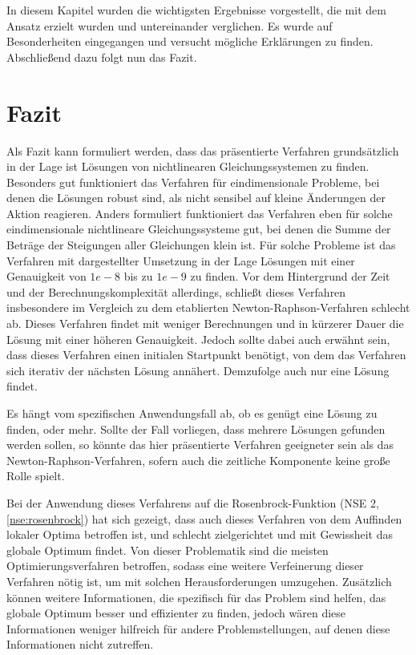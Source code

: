 \documentclass{article}
\theoremstyle{newline}
\begin{document}
\begin{onehalfspace}
In diesem Kapitel wurden die wichtigsten Ergebnisse vorgestellt, die mit dem Ansatz erzielt wurden und untereinander verglichen. Es wurde auf Besonderheiten eingegangen und versucht mögliche Erklärungen zu finden. Abschließend dazu folgt nun das Fazit.


\section{Fazit}

Als Fazit kann formuliert werden, dass das präsentierte Verfahren grundsätzlich in der Lage ist Lösungen von nichtlinearen Gleichungssystemen zu finden. Besonders gut funktioniert das Verfahren für eindimensionale Probleme, bei denen die Lösungen robust sind, als nicht sensibel auf kleine Änderungen der Aktion reagieren. Anders formuliert funktioniert das Verfahren eben für solche eindimensionale nichtlineare Gleichungssysteme gut, bei denen die Summe der Beträge der Steigungen aller Gleichungen klein ist. Für solche Probleme ist das Verfahren mit dargestellter Umsetzung in der Lage Lösungen mit einer Genauigkeit von $1e-8$ bis zu $1e-9$ zu finden. Vor dem Hintergrund der Zeit und der Berechnungskomplexität allerdings, schließt dieses Verfahren insbesondere im Vergleich zu dem etablierten Newton-Raphson-Verfahren schlecht ab. Dieses Verfahren findet mit weniger Berechnungen und in kürzerer Dauer die Lösung mit einer höheren Genauigkeit. Jedoch sollte dabei auch erwähnt sein, dass dieses Verfahren einen initialen Startpunkt benötigt, von dem das Verfahren sich iterativ der nächsten Lösung annähert. Demzufolge auch nur eine Lösung findet. 

Es hängt vom spezifischen Anwendungsfall ab, ob es genügt eine Lösung zu finden, oder mehr. Sollte der Fall vorliegen, dass mehrere Lösungen gefunden werden sollen, so könnte das hier präsentierte Verfahren geeigneter sein als das Newton-Raphson-Verfahren, sofern auch die zeitliche Komponente keine große Rolle spielt.
\medskip

Bei der Anwendung dieses Verfahrens auf die Rosenbrock-Funktion (NSE 2, \ref{nse:rosenbrock}) hat sich gezeigt, dass auch dieses Verfahren von dem Auffinden lokaler Optima betroffen ist, und schlecht zielgerichtet und mit Gewissheit das globale Optimum findet. Von dieser Problematik sind die meisten Optimierungsverfahren betroffen, sodass eine weitere Verfeinerung dieser Verfahren nötig ist, um mit solchen Herausforderungen umzugehen. Zusätzlich können weitere Informationen, die spezifisch für das Problem sind helfen, das globale Optimum besser und effizienter zu finden, jedoch wären diese Informationen weniger hilfreich für andere Problemstellungen, auf denen diese Informationen nicht zutreffen.
\medskip


\end{onehalfspace}
\end{document}

